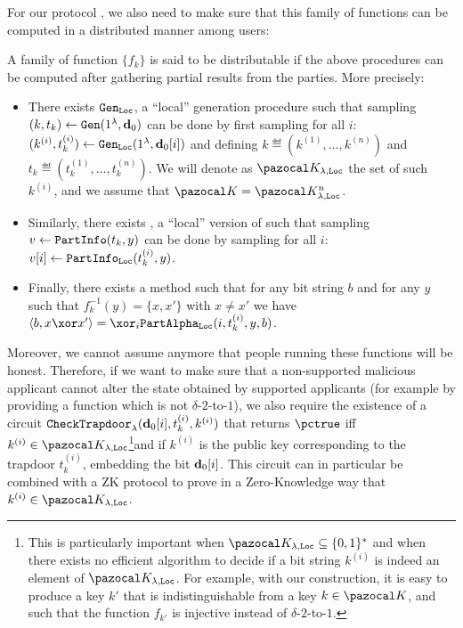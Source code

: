 For our protocol \authBlindCanDist{}, we also need to make sure that this family of functions can be computed in a distributed manner among users:
\begin{definition}\label{def:GHZdistCapable}
  A \AssumpFctCan{} family of function $\{f_k\}$ is said to be distributable if the above procedures can be computed after gathering partial results from the parties. More precisely:
  \begin{itemize}
    \item There exists $ {\tt Gen}_{\tt Loc}{}$, a ``local'' generation procedure such that sampling $(k,t_k) \leftarrow {\tt Gen}(1^\lambda,\mathbf{d}_0)$ can be done by first sampling for all $i$: $ (k^{(i)},t_k^{(i)}) \leftarrow  {\tt Gen}_{\tt Loc}(1^\lambda,\mathbf{d}_0[i])$ and defining $k \eqdef (k^{(1)},\dots,k^{(n)})$ and $t_k \eqdef (t_k^{(1)},\dots,t_k^{(n)})$. We will denote as $\cK_{\lambda,\texttt{Loc}}$ the set of such $k^{(i)}$, and we assume that $\cK = \cK_{\lambda,\texttt{Loc}}^{n}$.
    \item Similarly, there exists \partialInfoLocal{}, a ``local'' version of \partialInfo{} such that sampling $v \leftarrow {\tt PartInfo}{}(t_k,y)$ can be done by sampling for all $i$: $v[i] \leftarrow {\tt PartInfo_{\tt Loc}}{}(t_k^{(i)},y)$.
    \item Finally, there exists a method \partialAlpha{} such that for any bit string $b$ and for any $y$ such that $f_k^{-1}(y) = \{x,x'\}$ with $x \neq x'$ we have $\langle b, x \xor x' \rangle = \xor_i \partialAlpha(i, t_k^{(i)},y,b)$.
  \end{itemize}
  Moreover, we cannot assume anymore that people running these functions will be honest. Therefore, if we want to make sure that a non-supported malicious applicant cannot alter the state obtained by supported applicants (for example by providing a function which is not $\delta$-$2$-to-$1$), we also require the existence of a circuit ${\tt CheckTrapdoor}_\lambda(\mathbf{d}_0[i], t_k^{(i)}, k^{(i)})$ that returns $\pctrue$ iff $k^{(i)} \in \cK_{\lambda,\texttt{Loc}}$\footnote{This is particularly important when $\cK_{\lambda,\texttt{Loc}} \subseteq \{0,1\}^*$ and when there exists no efficient algorithm to decide if a bit string $k^{(i)}$ is indeed an element of $\cK_{\lambda,\texttt{Loc}}$. For example, with our construction, it is easy to produce a key $k'$ that is indistinguishable from a key $k \in \cK$, and such that the function $f_{k'}$ is injective instead of $\delta$-$2$-to-$1$.}and if $k^{(i)}$ is the public key corresponding to the trapdoor $t_k^{(i)}$, embedding the bit $\mathbf{d}_0[i]$. This circuit can in particular be combined with a ZK protocol to prove in a Zero-Knowledge way that $k^{(i)} \in \cK_{\lambda,\texttt{Loc}}$.
\end{definition}

